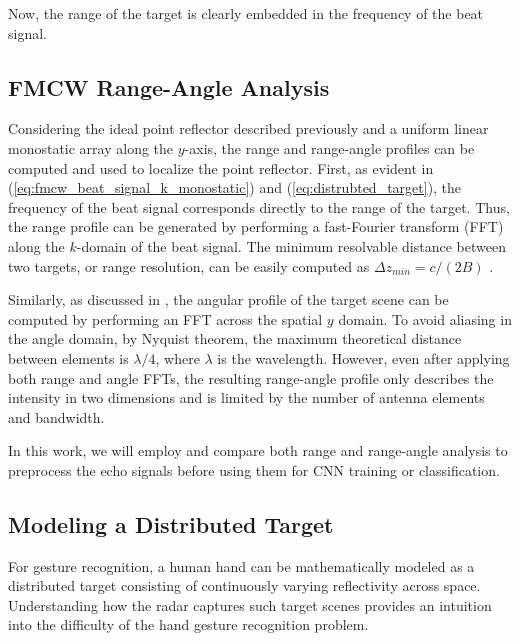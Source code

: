 \documentclass{ieeeaccess}
\begin{document}
Now, the range of the target is clearly embedded in the frequency of the beat signal.

\subsection{FMCW Range-Angle Analysis}
\label{subsec:fmcw_range_angle_analysis}
Considering the ideal point reflector described previously and a uniform linear monostatic array along the $y$-axis, the range and range-angle profiles can be computed and used to localize the point reflector. First, as evident in (\ref{eq:fmcw_beat_signal_k_monostatic}) and (\ref{eq:distrubted_target}), the frequency of the beat signal corresponds directly to the range of the target. Thus, the range profile can be generated by performing a fast-Fourier transform (FFT) along the $k$-domain of the beat signal. The minimum resolvable distance between two targets, or range resolution, can be easily computed as $\Delta z_{min} = c/(2B)$ \cite{Sheen:NearField3DRadarImaging}. 

Similarly, as discussed in \cite{TI:mmWave}, the angular profile of the target scene can be computed by performing an FFT across the spatial $y$ domain. To avoid aliasing in the angle domain, by Nyquist theorem, the maximum theoretical distance between elements is $\lambda/4$, where $\lambda$ is the wavelength. However, even after applying both range and angle FFTs, the resulting range-angle profile only describes the intensity in two dimensions and is limited by the number of antenna elements and bandwidth.

In this work, we will employ and compare both range and range-angle analysis to preprocess the echo signals before using them for CNN training or classification.

\subsection{Modeling a Distributed Target}
\label{subsec:distributed_target}
For gesture recognition, a human hand can be mathematically modeled as a distributed target consisting of continuously varying reflectivity across space. Understanding how the radar captures such target scenes provides an intuition into the difficulty of the hand gesture recognition problem.
\end{document}
